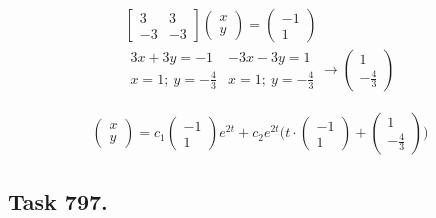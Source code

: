 \documentclass{article}
\begin{document}
\begin{fleqn}[1\parindent]
\begin{gather*}
    \begin{bmatrix}
      3&3\\-3&-3
    \end{bmatrix}
    \begin{pmatrix}
      x\\y
    \end{pmatrix}
    =
    \begin{pmatrix}
      -1\\1
    \end{pmatrix} \\ 
    \begin{matrix}
      3x+3y=-1 & -3x-3y=1\\ 
      x=1;\ y = -\frac{4}{3} & x=1;\ y=-\frac{4}{3}
    \end{matrix} \rightarrow 
    \begin{pmatrix}
      1 \\ -\frac{4}{3}
    \end{pmatrix}
  \end{gather*}
\end{fleqn}

\addtolength{\jot}{1pt}
\begin{fleqn}[1\parindent]
  \begin{gather*}
    \begin{pmatrix}
      x\\y
    \end{pmatrix} = 
    c_1 
    \begin{pmatrix}
      -1\\1
    \end{pmatrix}
    e^{2t}+c_2e^{2t}
    \Bigg(t\cdot\begin{pmatrix}
      -1\\1
    \end{pmatrix}
    +
    \begin{pmatrix}
      1\\-\frac{4}{3}
    \end{pmatrix}\Bigg)
  \end{gather*}
\end{fleqn}

\subsection*{Task 797.}
\end{document}

